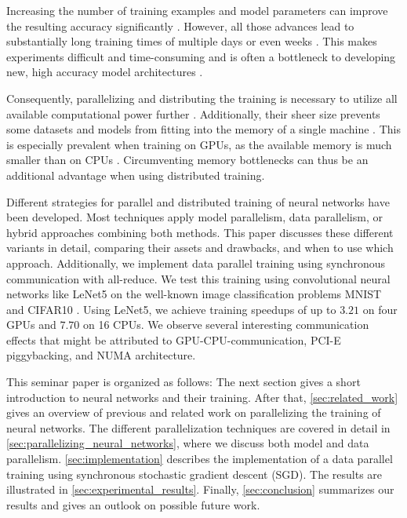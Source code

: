 \documentclass[conference,compsoc,a4paper]{IEEEtran}
\begin{document}
Increasing the number of training examples and model parameters can improve the resulting accuracy significantly \cite{dean2012-Large-scale-distributed}.
However, all those advances lead to substantially long training times of multiple days or even weeks \cite{jin2016-How-to-scale,chilimbi2014-Project-Adam,sergeev2018horovod}.
This makes experiments difficult and time-consuming \cite{yadan2013-Multi-GPU-Training,jiang2018-FiLayer} and is often a bottleneck to developing new, high accuracy model architectures \cite{iandola2016-Firecaffe}.

Consequently, parallelizing and distributing the training is necessary to utilize all available computational power further \cite{jiang2018-FiLayer,recht2011-Hogwild}.
Additionally, their sheer size prevents some datasets and models from fitting into the memory of a single machine \cite{recht2011-Hogwild,dean2012-Large-scale-distributed}.
This is especially prevalent when training on GPUs, as the available memory is much smaller than on CPUs \cite{dean2012-Large-scale-distributed}.
Circumventing memory bottlenecks can thus be an additional advantage when using distributed training.

Different strategies for parallel and distributed training of neural networks have been developed.
Most techniques apply model parallelism, data parallelism, or hybrid approaches combining both methods.
This paper discusses these different variants in detail, comparing their assets and drawbacks, and when to use which approach.
Additionally, we implement data parallel training using synchronous communication with all-reduce.
We test this training using convolutional neural networks like LeNet5 \cite{lecun1998gradient} on the well-known image classification problems MNIST \cite{lecun1998gradient} and \mbox{CIFAR10} \cite{krizhevsky2009CIFAR10}.
Using LeNet5, we achieve training speedups of up to $3.21$ on four GPUs and $7.70$ on 16 CPUs.
We observe several interesting communication effects that might be attributed to GPU-CPU-communication, PCI-E piggybacking, and NUMA architecture.

This seminar paper is organized as follows:
The next section gives a short introduction to neural networks and their training.
After that, \autoref{sec:related_work} gives an overview of previous and related work on parallelizing the training of neural networks.
The different parallelization techniques are covered in detail in \autoref{sec:parallelizing_neural_networks}, where we discuss both model and data parallelism.
\autoref{sec:implementation} describes the implementation of a data parallel training using synchronous stochastic gradient descent (SGD).
The results are illustrated in \autoref{sec:experimental_results}.
Finally, \autoref{sec:conclusion} summarizes our results and gives an outlook on possible future work.
\end{document}
